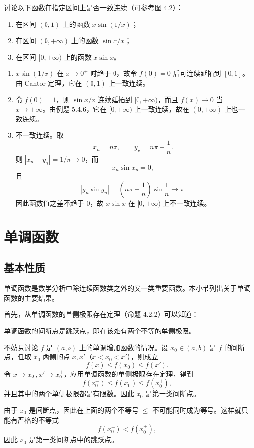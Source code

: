 \begin{xexercise}[9]
讨论以下函数在指定区间上是否一致连续（可参考图 4.2）：
  \begin{enumerate}[label=(\arabic*)]
    \item 在区间 $(0,1)$ 上的函数 $x\sin(1/x)$；
    \item 在区间 $(0,+\infty)$ 上的函数 $\sin x/x$；
    \item 在区间 $[0,+\infty)$ 上的函数 $x\sin x$。
  \end{enumerate}
\end{xexercise}
\begin{xsolution}
\begin{enumerate}[label=(\arabic*)]
 \item $x\sin(1/x)$ 在 $x\to0^+$ 时趋于 $0$，故令 $f(0)=0$ 后可连续延拓到 $[0,1]$。由 Cantor 定理，它在 $(0,1)$ 上一致连续。

 \item 令 $f(0)=1$，则 $\sin x/x$ 连续延拓到 $[0,+\infty)$，而且 $f(x)\to0$ 当 $x\to+\infty$。由例题 5.4.6，它在 $[0,+\infty)$ 上一致连续，故在 $(0,+\infty)$ 上也一致连续。

 \item 不一致连续。取
 \[
  x_n=n\pi,
  \qquad y_n=n\pi+\frac1n.
 \]
 则 $|x_n-y_n|=1/n\to0$，而
 \[
  x_n\sin x_n=0,
 \]
 且
 \[
  |y_n\sin y_n|
  =\left(n\pi+\frac1n\right)\sin\frac1n
  \longrightarrow\pi.
 \]
 因此函数值之差不趋于 $0$，故 $x\sin x$ 在 $[0,+\infty)$ 上不一致连续。
\end{enumerate}
\end{xsolution}


\section{单调函数}

\subsection{基本性质}

单调函数是数学分析中除连续函数类之外的又一类重要函数。本小节列出关于单调函数的主要结果。

首先，从单调函数的单侧极限存在定理（命题 4.2.2）可以知道：

\begin{xproposition}[5.5.1]
单调函数的间断点是跳跃点，即在该处有两个不等的单侧极限。
\end{xproposition}
\begin{xproof}
不妨只讨论 $f$ 是 $(a,b)$ 上的单调增加函数的情况。设 $x_0\in(a,b)$ 是 $f$ 的间断点，任取 $x_0$ 两侧的点 $x,x'$（$x<x_0<x'$），则成立
\begin{equation}
  f(x)\le f(x_0)\le f(x').
  \tag{5.4}
  \label{eq:5.4}
\end{equation}
令 $x\to x_0^-,x'\to x_0^+$，应用单调函数的单侧极限存在定理，得到
\[
  f(x_0^-)\le f(x_0)\le f(x_0^+),
\]
并且其中的两个单侧极限都是有限数。因此 $x_0$ 是第一类间断点。

由于 $x_0$ 是间断点，因此在上面的两个不等号 $\le$ 不可能同时成为等号。这样就只能有严格的不等式
\[
  f(x_0^-)<f(x_0^+),
\]
因此 $x_0$ 是第一类间断点中的跳跃点。
\end{xproof}

